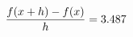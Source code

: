 \documentclass[preview]{standalone}
\begin{document}
\begin{align*}
\special{dvisvgm:raw <g id='unique000'>}\frac{f(x+h)-f(x)}{h} = 3.487\special{dvisvgm:raw </g>}
\end{align*}
\end{document}
